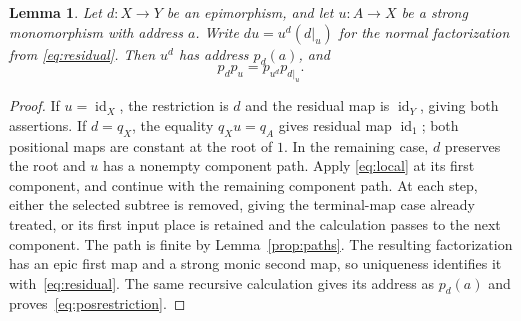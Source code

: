 \documentclass[11pt,a4paper]{article}
\theoremstyle{plain}
\newtheorem{lemma}[theorem]{Lemma}
\theoremstyle{definition}
\theoremstyle{remark}
\newcommand{\one}{1}
\newcommand{\id}{\operatorname{id}}
\begin{document}
\begin{lemma}\label{lem:restriction}
Let $d:X\to Y$ be an epimorphism, and let $u:A\to X$ be a
strong monomorphism with address $a$. Write
$du=u^d(d|_u)$ for the normal factorization from
\eqref{eq:residual}. Then $u^d$ has address $p_d(a)$, and
\begin{equation}\label{eq:posrestriction}
p_dp_u=p_{u^d}p_{d|_u}.
\end{equation}
\end{lemma}
\begin{proof}
If $u=\id_X$, the restriction is $d$ and the residual map is
$\id_Y$, giving both assertions. If $d=q_X$, the equality
$q_Xu=q_A$ gives residual map $\id_\one$; both positional maps
are constant at the root of $\one$. In the remaining case, $d$
preserves the root and $u$ has a nonempty component path. Apply
\eqref{eq:local} at its first component, and continue with the
remaining component path. At each step, either the selected
subtree is removed, giving the terminal-map case already treated,
or its first input place is retained and the calculation passes
to the next component. The path is finite by
Lemma~\ref{prop:paths}. The resulting factorization has an epic
first map and a strong monic second map, so uniqueness identifies
it with~\eqref{eq:residual}. The same recursive calculation gives
its address as $p_d(a)$ and proves~\eqref{eq:posrestriction}.
\end{proof}
\end{document}
